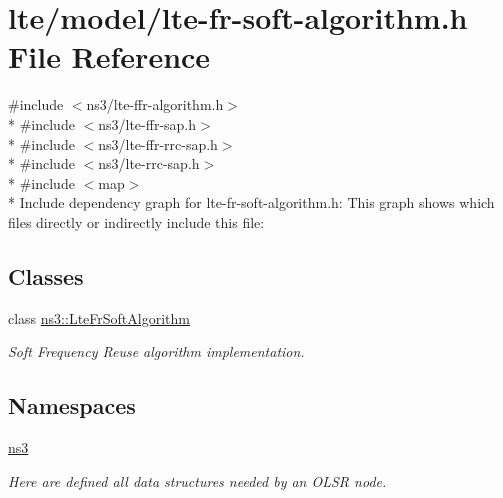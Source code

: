 \hypertarget{lte-fr-soft-algorithm_8h}{}\section{lte/model/lte-\/fr-\/soft-\/algorithm.h File Reference}
\label{lte-fr-soft-algorithm_8h}
{\ttfamily \#include $<$ns3/lte-\/ffr-\/algorithm.\+h$>$}\\*
{\ttfamily \#include $<$ns3/lte-\/ffr-\/sap.\+h$>$}\\*
{\ttfamily \#include $<$ns3/lte-\/ffr-\/rrc-\/sap.\+h$>$}\\*
{\ttfamily \#include $<$ns3/lte-\/rrc-\/sap.\+h$>$}\\*
{\ttfamily \#include $<$map$>$}\\*
Include dependency graph for lte-\/fr-\/soft-\/algorithm.h\+:
This graph shows which files directly or indirectly include this file\+:
\subsection*{Classes}
\begin{DoxyCompactItemize}
\item 
class \hyperlink{classns3_1_1LteFrSoftAlgorithm}{ns3\+::\+Lte\+Fr\+Soft\+Algorithm}
\begin{DoxyCompactList}\small\item\em Soft Frequency Reuse algorithm implementation. \end{DoxyCompactList}\end{DoxyCompactItemize}
\subsection*{Namespaces}
\begin{DoxyCompactItemize}
\item 
 \hyperlink{namespacens3}{ns3}
\begin{DoxyCompactList}\small\item\em Here are defined all data structures needed by an O\+L\+SR node. \end{DoxyCompactList}\end{DoxyCompactItemize}
